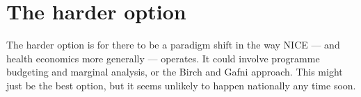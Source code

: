 \section{The harder option}
The harder option is for there to be a paradigm shift in the way NICE --- and health economics more generally --- operates. It could involve programme budgeting and marginal analysis, or the Birch and Gafni approach\cite{Ruta_2005,Birch_1992,Gafni_2006}. This might just be the best option, but it seems unlikely to happen nationally any time soon.